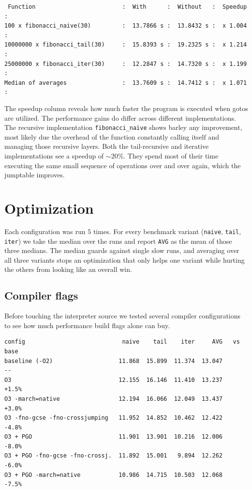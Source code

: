 \documentclass[a4paper]{article}
\begin{document}
\begin{verbatim}
 Function                         :  With      :  Without   :  Speedup :
100 x fibonacci_naive(30)         :  13.7866 s :  13.8432 s :  x 1.004 :
10000000 x fibonacci_tail(30)     :  15.8393 s :  19.2325 s :  x 1.214 :
25000000 x fibonacci_iter(30)     :  12.2847 s :  14.7320 s :  x 1.199 :
Median of averages                :  13.7609 s :  14.7412 s :  x 1.071 :
\end{verbatim}

The speedup column reveals how much faster the program is executed when gotos are utilized. The performance gains do differ across different implementations. The recursive implementation \texttt{fibonacci\_naive} shows barley any improvement, most likely due the overhead of the function constantly calling itself and managing those recursive layers. Both the tail-recursive and iterative implementations see a speedup of $\sim$20\%. They spend most of their time executing the same small sequence of operations over and over again, which the jumptable improves. 

\newpage
\section{Optimization}
Each configuration was run $5$ times. For every benchmark variant (\texttt{naive}, \texttt{tail}, \texttt{iter}) we take the median over the runs and report \texttt{AVG} as the mean of those three medians. The median guards against single slow runs, and averaging over all three variants stops an optimization that only helps one variant while hurting the others from looking like an overall win.

\subsection{Compiler flags}
Before touching the interpreter source we tested several compiler configurations to see how much performance build flags alone can buy.

\begin{verbatim}
config                            naive    tail    iter     AVG   vs base
baseline (-O2)                   11.868  15.899  11.374  13.047       --
O3                               12.155  16.146  11.410  13.237    +1.5%
O3 -march=native                 12.194  16.066  12.049  13.437    +3.0%
O3 -fno-gcse -fno-crossjumping   11.952  14.852  10.462  12.422    -4.8%
O3 + PGO                         11.901  13.901  10.216  12.006    -8.0%
O3 + PGO -fno-gcse -fno-crossj.  11.892  15.001   9.894  12.262    -6.0%
O3 + PGO -march=native           10.986  14.715  10.503  12.068    -7.5%
\end{verbatim}
\end{document}
